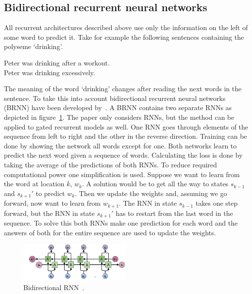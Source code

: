 \subsection{Bidirectional recurrent neural networks}
\label{subsec:bidirectional}
All recurrent architectures described above use only the information on the left of some word to predict it.
Take for example the following sentences containing the polyseme `drinking'.
\begin{center}
    Peter was drinking after a workout.\\[3mm]
    Peter was drinking excessively.
\end{center}
The meaning of the word `drinking' changes after reading the next words in the sentence.
To take this into account bidirectional recurrent neural networks (BRNN) have been developed by~\citet{schuster1997}.
A BRNN contains two separate RNNs as depicted in figure~\ref{fig:bidirectional}.
The paper only considers RNNs, but the method can be applied to gated recurrent models as well.
One RNN goes through elements of the sequence from left to right and the other in the reverse direction.
Training can be done by showing the network all words except for one.
Both networks learn to predict the next word given a sequence of words.
Calculating the loss is done by taking the average of the predictions of both RNNs.
To reduce required computational power one simplification is used.
Suppose we want to learn from the word at location $k$, $w_k$.
A solution would be to get all the way to states $s_{k-1}$ and $s_{k+1}'$ to predict $w_k$.
Then we update the weights and, assuming we go forward, now want to learn from $w_{k+1}$.
The RNN in state $s_{k-1}$ takes one step forward, but the RNN in state $s_{k+1}'$ has to restart from the last word in the sequence.
To solve this both RNNs make one prediction for each word and the answers of both for the entire sequence are used to update the weights.

\begin{figure}[htbp]
    \begin{center}
        \includegraphics[width=0.5\textwidth]{figures/bidirectional.png}
    \end{center}
    \caption{Bidirectional RNN~\citep{olah2015}.}
    \label{fig:bidirectional}
\end{figure}

